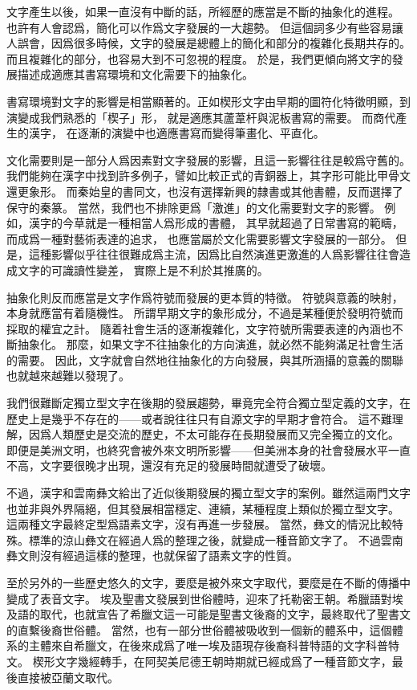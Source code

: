 文字產生以後，如果一直沒有中斷的話，所經歷的應當是不斷的抽象化的進程。
也許有人會認爲，簡化可以作爲文字發展的一大趨勢。
但這個詞多少有些容易讓人誤會，因爲很多時候，文字的發展是總體上的簡化和部分的複雜化長期共存的。
而且複雜化的部分，也容易大到不可忽視的程度。
於是，我們更傾向將文字的發展描述成適應其書寫環境和文化需要下的抽象化。

書寫環境對文字的影響是相當顯著的。正如楔形文字由早期的圖符化特徵明顯，到演變成我們熟悉的「楔子」形，
就是適應其蘆葦杆與泥板書寫的需要。
而商代產生的漢字，
在逐漸的演變中也適應書寫而變得筆畫化、平直化。

文化需要則是一部分人爲因素對文字發展的影響，且這一影響往往是較爲守舊的。
我們能夠在漢字中找到許多例子，譬如比較正式的青銅器上，其字形可能比甲骨文還更象形。
而秦始皇的書同文，也沒有選擇新興的隸書或其他書體，反而選擇了保守的秦篆。
當然，我們也不排除更爲「激進」的文化需要對文字的影響。
例如，漢字的今草就是一種相當人爲形成的書體，
其早就超過了日常書寫的範疇，而成爲一種對藝術表達的追求，
也應當屬於文化需要影響文字發展的一部分。
但是，這種影響似乎往往很難成爲主流，因爲比自然演進更激進的人爲影響往往會造成文字的可識讀性變差，
實際上是不利於其推廣的。

抽象化則反而應當是文字作爲符號而發展的更本質的特徵。
符號與意義的映射，本身就應當有着隨機性。
所謂早期文字的象形成分，不過是某種便於發明符號而採取的權宜之計。
隨着社會生活的逐漸複雜化，文字符號所需要表達的內涵也不斷抽象化。
那麼，如果文字不往抽象化的方向演進，就必然不能夠滿足社會生活的需要。
因此，文字就會自然地往抽象化的方向發展，與其所涵攝的意義的關聯也就越來越難以發現了。

我們很難斷定獨立型文字在後期的發展趨勢，畢竟完全符合獨立型定義的文字，在歷史上是幾乎不存在的——或者說往往只有自源文字的早期才會符合。
這不難理解，因爲人類歷史是交流的歷史，不太可能存在長期發展而又完全獨立的文化。
即便是美洲文明，也終究會被外來文明所影響——但美洲本身的社會發展水平一直不高，文字要很晚才出現，還沒有充足的發展時間就遭受了破壞。

不過，漢字和雲南彝文給出了近似後期發展的獨立型文字的案例。雖然這兩門文字也並非與外界隔絕，但其發展相當穩定、連續，某種程度上類似於獨立型文字。
這兩種文字最終定型爲語素文字，沒有再進一步發展。
當然，彝文的情況比較特殊。標準的涼山彝文在經過人爲的整理之後，就變成一種音節文字了。
不過雲南彝文則沒有經過這樣的整理，也就保留了語素文字的性質。

至於另外的一些歷史悠久的文字，要麼是被外來文字取代，要麼是在不斷的傳播中變成了表音文字。
埃及聖書文發展到世俗體時，迎來了托勒密王朝。希臘語對埃及語的取代，也就宣告了希臘文這一可能是聖書文後裔的文字，最終取代了聖書文的直繫後裔世俗體。
當然，也有一部分世俗體被吸收到一個新的體系中，這個體系的主體來自希臘文，在後來成爲了唯一埃及語現存後裔科普特語的文字科普特文。
楔形文字幾經轉手，在阿契美尼德王朝時期就已經成爲了一種音節文字，最後直接被亞蘭文取代。


